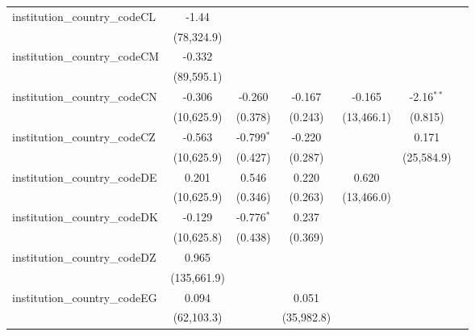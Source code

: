 \begin{tabular}{lcccccc}
   institution\_country\_codeCL          & -1.44         &               &               &             &               &   \\   
                                         & (78,324.9)    &               &               &             &               &   \\   
   institution\_country\_codeCM          & -0.332        &               &               &             &               &   \\   
                                         & (89,595.1)    &               &               &             &               &   \\   
   institution\_country\_codeCN          & -0.306        & -0.260        & -0.167        & -0.165      & -2.16$^{**}$  &   \\   
                                         & (10,625.9)    & (0.378)       & (0.243)       & (13,466.1)  & (0.815)       &   \\   
   institution\_country\_codeCZ          & -0.563        & -0.799$^{*}$  & -0.220        &             & 0.171         &   \\   
                                         & (10,625.9)    & (0.427)       & (0.287)       &             & (25,584.9)    &   \\   
   institution\_country\_codeDE          & 0.201         & 0.546         & 0.220         & 0.620       &               &   \\   
                                         & (10,625.9)    & (0.346)       & (0.263)       & (13,466.0)  &               &   \\   
   institution\_country\_codeDK          & -0.129        & -0.776$^{*}$  & 0.237         &             &               &   \\   
                                         & (10,625.8)    & (0.438)       & (0.369)       &             &               &   \\   
   institution\_country\_codeDZ          & 0.965         &               &               &             &               &   \\   
                                         & (135,661.9)   &               &               &             &               &   \\   
   institution\_country\_codeEG          & 0.094         &               & 0.051         &             &               &   \\   
                                         & (62,103.3)    &               & (35,982.8)    &             &               &   \\   

\end{tabular}
